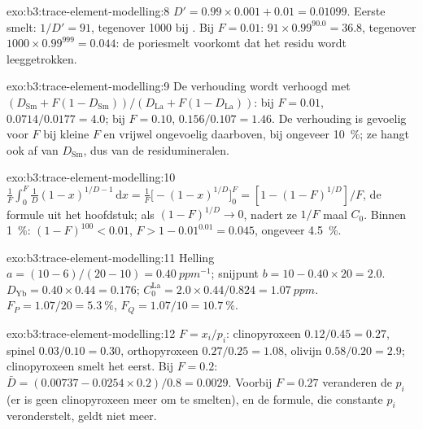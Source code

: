 \begin{solution}{exo:b3:trace-element-modelling:8}
$D' = 0.99\times0.001 + 0.01 = 0.01099$. Eerste smelt: $1/D' = 91$, tegenover
1000 bij . Bij $F = 0.01$: $91\times0.99^{90.0} = 36.8$,
tegenover $1000\times0.99^{999} = 0.044$: de poriesmelt voorkomt dat het residu
wordt leeggetrokken.
\end{solution}

\begin{solution}{exo:b3:trace-element-modelling:9}
De verhouding wordt verhoogd met $(D_{\mathrm{Sm}} + F(1 - D_{\mathrm{Sm}}))/(D_{\mathrm{La}}
+ F(1 - D_{\mathrm{La}}))$: bij $F = 0.01$, $0.0714/0.0177 = 4.0$; bij $F = 0.10$,
$0.156/0.107 = 1.46$. De verhouding is gevoelig voor $F$ bij kleine $F$ en vrijwel
ongevoelig daarboven, bij ongeveer \qty{10}{\percent}; ze hangt ook af van $D_{\mathrm{Sm}}$,
dus van de residumineralen.
\end{solution}

\begin{solution}{exo:b3:trace-element-modelling:10}
$\frac1F\int_0^F \frac1D(1 - x)^{1/D - 1}\,\mathrm dx = \frac1F\bigl[-(1 -
x)^{1/D}\bigr]_0^F = [1 - (1 - F)^{1/D}]/F$, de formule uit het hoofdstuk; als
$(1 - F)^{1/D} \to 0$, nadert ze $1/F$ maal $C_0$. Binnen \qty{1}{\percent}:
$(1 - F)^{100} < 0.01$, $F > 1 - 0.01^{0.01} = 0.045$, ongeveer
\qty{4.5}{\percent}.
\end{solution}

\begin{solution}{exo:b3:trace-element-modelling:11}
Helling $a = (10 - 6)/(20 - 10) = \qty{0.40}{ppm^{-1}}$; snijpunt $b = 10 -
0.40\times20 = 2.0$. $D_{\mathrm{Yb}} = 0.40\times0.44 = 0.176$;
$C_0^{\mathrm{La}} = 2.0\times0.44/0.824 = \qty{1.07}{ppm}$. $F_P = 1.07/20 =
\qty{5.3}{\percent}$, $F_Q = 1.07/10 = \qty{10.7}{\percent}$.
\end{solution}

\begin{solution}{exo:b3:trace-element-modelling:12}
$F = x_i/p_i$: clinopyroxeen $0.12/0.45 = 0.27$, spinel $0.03/0.10 = 0.30$,
orthopyroxeen $0.27/0.25 = 1.08$, olivijn $0.58/0.20 = 2.9$; clinopyroxeen
smelt het eerst. Bij $F = 0.2$: $\bar D = (0.00737 - 0.0254\times0.2)/0.8 =
0.0029$. Voorbij $F = 0.27$ veranderen de $p_i$ (er is geen clinopyroxeen meer
om te smelten), en de formule, die constante $p_i$ veronderstelt, geldt niet meer.
\end{solution}

